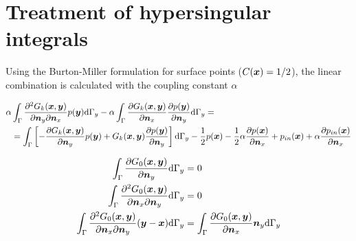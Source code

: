 \documentclass[a4paper, 10pt]{article}
\newcommand{\td}{\mathrm{d}}
\newcommand{\sx}{\bm{\mathnormal{x}}}
\newcommand{\sy}{\bm{\mathnormal{y}}}
\newcommand{\sn}{\bm{\mathnormal{n}}}
\begin{document}
\section{Treatment of hypersingular integrals}

Using the Burton-Miller formulation for surface points ($C(\sx) = 1/2$), the linear combination is calculated with the coupling constant $\alpha$

\begin{align}
	\alpha & \int_\Gamma \frac{\partial^2{G}_k (\sx, \sy)}{\partial \sn_y \partial \sn_x} p(\sy) \td \Gamma_y -
	\alpha \int_\Gamma \frac{\partial{G}_k (\sx, \sy)}{\partial \sn_x} \frac{\partial p(\sy)}{\partial \sn_y} \td \Gamma_y = \nonumber \\
	& = \int_{\Gamma}\left[-\frac{\partial{G}_k (\sx, \sy)}{\partial \sn_y} p(\sy) + G_k(\sx,\sy)\frac{\partial p(\sy)}{\partial \sn_y}\right] \td \Gamma_y - \frac{1}{2} p(\sx) - \frac{1}{2}\alpha \frac{ \partial p(\sx)}{\partial \sn_x} + p_{in}(\sx) + \alpha \frac{\partial p_{in}(\sx)}{\partial \sn_x}
\end{align}

\begin{align}
	\int_\Gamma \frac{\partial G_0(\sx, \sy)}{\partial \sn_y} \td \Gamma_y & = 0 \\
	\int_\Gamma \frac{\partial^2 G_0(\sx, \sy)}{\partial \sn_x \partial \sn_y} \td \Gamma_y & = 0 \\
	\int_\Gamma \frac{\partial^2 G_0(\sx, \sy)}{\partial \sn_x \partial \sn_y}(\sy - \sx) \td \Gamma_y & = \int_\Gamma \frac{\partial G_0(\sx, \sy)}{\partial \sn_x} \sn_y \td \Gamma_y 
\end{align}
\end{document}
